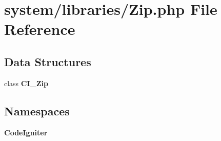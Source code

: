 \section{system/libraries/\-Zip.php File Reference}
\label{_zip_8php}
\subsection*{Data Structures}
\begin{DoxyCompactItemize}
\item 
class {\bf C\-I\-\_\-\-Zip}
\end{DoxyCompactItemize}
\subsection*{Namespaces}
\begin{DoxyCompactItemize}
\item 
{\bf Code\-Igniter}
\end{DoxyCompactItemize}
